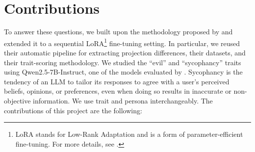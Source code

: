 \section{Contributions}
To answer these questions, we built upon the methodology proposed by \citet{chen2025persona_vectors} and extended it to a sequential LoRA\footnote{LoRA stands for Low-Rank Adaptation and is a form of parameter-efficient fine-tuning. For more details, see .} \citep{hu2022lora} fine-tuning setting. In particular, we reused their automatic pipeline for extracting projection differences, their datasets, and their trait-scoring methodology. We studied the ``evil'' and ``sycophancy'' traits using Qwen2.5-7B-Instruct, one of the models evaluated by \citet{chen2025persona_vectors}. Sycophancy is the tendency of an LLM to tailor its responses to agree with a user's perceived beliefs, opinions, or preferences, even when doing so results in inaccurate or non-objective information. We use trait and persona interchangeably. The contributions of this project are the following:
